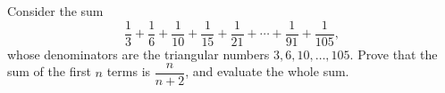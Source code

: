 Consider the sum
\[
\dfrac{1}{3}+\dfrac{1}{6}+\dfrac{1}{10}+\dfrac{1}{15}+\dfrac{1}{21}+\cdots+\dfrac{1}{91}+\dfrac{1}{105},
\]
whose denominators are the triangular numbers $3,6,10,\dots,105$. Prove that the sum of the first $n$ terms is $\dfrac{n}{n+2}$, and evaluate the whole sum.
